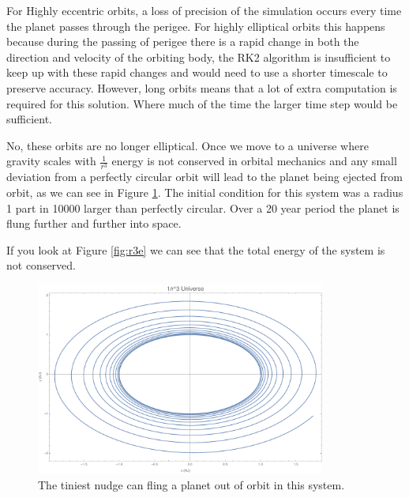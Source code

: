 \documentclass{article}
\begin{document}
For Highly eccentric orbits, a loss of precision of the simulation occurs every time the planet passes through the perigee. For highly elliptical orbits this happens because during the passing of perigee there is a rapid change in both the direction and velocity of the orbiting body, the RK2 algorithm is insufficient to keep up with these rapid changes and would need to use a shorter timescale to preserve accuracy. However, long orbits means that a lot of extra computation is required for this solution. Where much of the time the larger time step would be sufficient.


\bigskip
{}
\medskip

No, these orbits are no longer elliptical. Once we move to a universe where gravity scales with $\frac{1}{r^3}$ energy is not conserved in orbital mechanics and any small deviation from a perfectly circular orbit will lead to the planet being ejected from orbit, as we can see in Figure \ref{fig:r3}. The initial condition for this system was a radius 1 part in 10000 larger than perfectly circular. Over a 20 year period the planet is flung further and further into space.

If you look at Figure \ref{fig:r3e} we can see that the total energy of the system is not conserved.

\begin{figure}[!htb]
	\begin{center}
		\includegraphics[width=0.85\textwidth]{r3.pdf}
	\end{center}
	\caption{The tiniest nudge can fling a planet out of orbit in this system.}
	\label{fig:r3}
\end{figure}
\FloatBarrier
\end{document}
